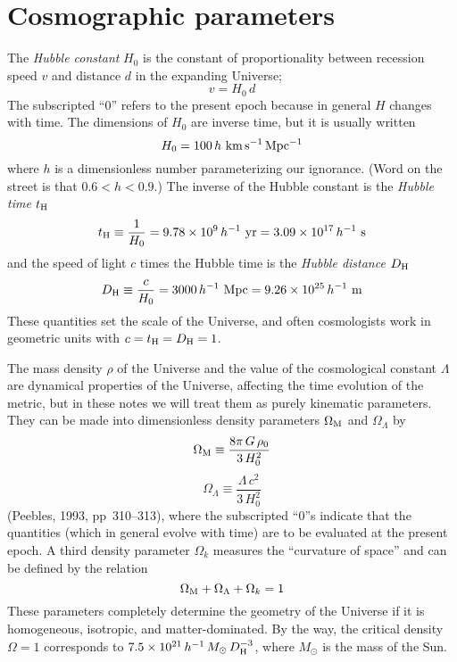 \section{Cosmographic parameters}

The {\em Hubble constant\/} $H_0$ is the constant of proportionality
between recession speed $v$ and distance $d$ in the expanding
Universe;
\begin{equation}
v=H_0\, d
\end{equation}
The subscripted ``0'' refers to the present epoch because in general
$H$ changes with time.  The dimensions of $H_0$ are inverse time, but
it is usually written
\begin{equation}
H_0=100\,h~{\rm km\,s^{-1}\,Mpc^{-1}}
\end{equation}
where $h$ is a dimensionless number parameterizing our ignorance.
(Word on the street is that $0.6<h<0.9$.)  The inverse of the Hubble
constant is the {\em Hubble time\/} $t_{\rm H}$
\begin{equation}
\label{eq:th}
t_{\rm H}\equiv\frac{1}{H_0}
= 9.78\times10^9\,h^{-1}~{\rm yr}= 3.09\times10^{17}\,h^{-1}~{\rm s}
\end{equation}
and the speed of light $c$ times the Hubble time is the {\em Hubble
distance\/} $D_{\rm H}$
\begin{equation}
\label{eq:dh}
D_{\rm H}\equiv\frac{c}{H_0}
= 3000\,h^{-1}~{\rm Mpc}= 9.26\times10^{25}\,h^{-1}~{\rm m}
\end{equation}
These quantities set the scale of the Universe, and often cosmologists
work in geometric units with $c=t_{\rm H}=D_{\rm H}=1$.

The mass density $\rho$ of the Universe and the value of the
cosmological constant $\Lambda$ are dynamical properties of the
Universe, affecting the time evolution of the metric, but in these
notes we will treat them as purely kinematic parameters.  They can be
made into dimensionless density parameters $\Omega_{\rm M}$ and
$\Omega_{\Lambda}$ by
\begin{equation}
\Omega_{\rm M}\equiv\frac{8\pi\,G\,\rho_0}{3\,H_0^2}
\end{equation}
\begin{equation}
\Omega_{\Lambda}\equiv\frac{\Lambda\,c^2}{3\,H_0^2}
\end{equation}
(Peebles, 1993, pp~310--313), where the subscripted ``0''s indicate
that the quantities (which in general evolve with time) are to be
evaluated at the present epoch.  A third density parameter $\Omega_k$
measures the ``curvature of space'' and can be defined by the relation
\begin{equation}
\Omega_{\rm M}+\Omega_{\Lambda}+\Omega_k= 1
\end{equation}
These parameters completely determine the geometry of the Universe if
it is homogeneous, isotropic, and matter-dominated.  By the way, the
critical density $\Omega=1$ corresponds to $7.5\times
10^{21}\,h^{-1}\,M_{\odot}\,D_{\rm H}^{-3}$, where $M_{\odot}$ is the
mass of the Sun.

